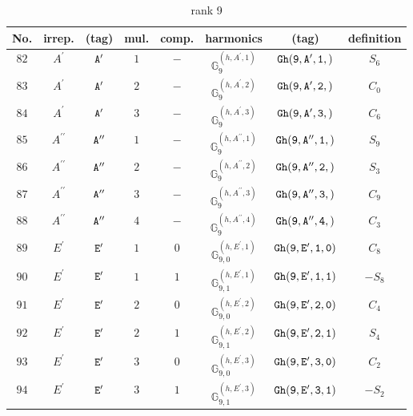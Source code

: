 \documentclass[fleqn,8pt]{jsarticle}
\begin{document}
\begin{table}[ht!]
\begin{center}
\caption{rank 9}
\renewcommand{\arraystretch}{1.3}
\begin{tabular}{cccccccc} \hline \hline
No. & irrep. & (tag) & mul. & comp. & harmonics & (tag) & definition \\ \hline
$ 82 $ & $ A^{\prime} $ & $ {\tt A'} $ & $ 1 $ & $ - $ & $ \mathbb{G}_{9}^{(h,A^{\prime},1)} $ & $ {\tt Gh(9,A',1,)} $ & $ S_{6} $ \\
$ 83 $ & $ A^{\prime} $ & $ {\tt A'} $ & $ 2 $ & $ - $ & $ \mathbb{G}_{9}^{(h,A^{\prime},2)} $ & $ {\tt Gh(9,A',2,)} $ & $ C_{0} $ \\
$ 84 $ & $ A^{\prime} $ & $ {\tt A'} $ & $ 3 $ & $ - $ & $ \mathbb{G}_{9}^{(h,A^{\prime},3)} $ & $ {\tt Gh(9,A',3,)} $ & $ C_{6} $ \\
$ 85 $ & $ A^{\prime\prime} $ & $ {\tt A''} $ & $ 1 $ & $ - $ & $ \mathbb{G}_{9}^{(h,A^{\prime\prime},1)} $ & $ {\tt Gh(9,A'',1,)} $ & $ S_{9} $ \\
$ 86 $ & $ A^{\prime\prime} $ & $ {\tt A''} $ & $ 2 $ & $ - $ & $ \mathbb{G}_{9}^{(h,A^{\prime\prime},2)} $ & $ {\tt Gh(9,A'',2,)} $ & $ S_{3} $ \\
$ 87 $ & $ A^{\prime\prime} $ & $ {\tt A''} $ & $ 3 $ & $ - $ & $ \mathbb{G}_{9}^{(h,A^{\prime\prime},3)} $ & $ {\tt Gh(9,A'',3,)} $ & $ C_{9} $ \\
$ 88 $ & $ A^{\prime\prime} $ & $ {\tt A''} $ & $ 4 $ & $ - $ & $ \mathbb{G}_{9}^{(h,A^{\prime\prime},4)} $ & $ {\tt Gh(9,A'',4,)} $ & $ C_{3} $ \\
$ 89 $ & $ E^{\prime} $ & $ {\tt E'} $ & $ 1 $ & $ 0 $ & $ \mathbb{G}_{9,0}^{(h,E^{\prime},1)} $ & $ {\tt Gh(9,E',1,0)} $ & $ C_{8} $ \\
$ 90 $ & $ E^{\prime} $ & $ {\tt E'} $ & $ 1 $ & $ 1 $ & $ \mathbb{G}_{9,1}^{(h,E^{\prime},1)} $ & $ {\tt Gh(9,E',1,1)} $ & $ - S_{8} $ \\
$ 91 $ & $ E^{\prime} $ & $ {\tt E'} $ & $ 2 $ & $ 0 $ & $ \mathbb{G}_{9,0}^{(h,E^{\prime},2)} $ & $ {\tt Gh(9,E',2,0)} $ & $ C_{4} $ \\
$ 92 $ & $ E^{\prime} $ & $ {\tt E'} $ & $ 2 $ & $ 1 $ & $ \mathbb{G}_{9,1}^{(h,E^{\prime},2)} $ & $ {\tt Gh(9,E',2,1)} $ & $ S_{4} $ \\
$ 93 $ & $ E^{\prime} $ & $ {\tt E'} $ & $ 3 $ & $ 0 $ & $ \mathbb{G}_{9,0}^{(h,E^{\prime},3)} $ & $ {\tt Gh(9,E',3,0)} $ & $ C_{2} $ \\
$ 94 $ & $ E^{\prime} $ & $ {\tt E'} $ & $ 3 $ & $ 1 $ & $ \mathbb{G}_{9,1}^{(h,E^{\prime},3)} $ & $ {\tt Gh(9,E',3,1)} $ & $ - S_{2} $ \\

\end{tabular}
\end{center}
\end{table}
\end{document}
